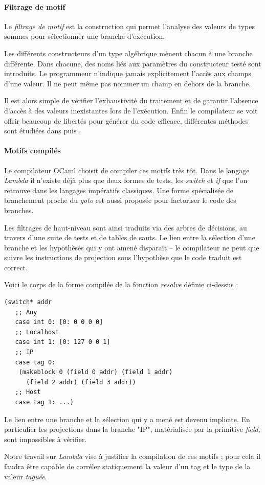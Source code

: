 \paragraph{Filtrage de motif} Le \emph{filtrage de motif} est la construction
qui permet l'analyse des valeurs de types sommes pour sélectionner une branche
d'exécution.

Les différents constructeurs d'un type algébrique mènent chacun à une branche
différente. Dans chacune, des noms liés aux paramètres du constructeur
testé sont introduits. Le programmeur n'indique jamais explicitement l'accès
aux champs d'une valeur. Il ne peut même pas nommer un champ en dehors de la
branche.

Il est alors simple de vérifier l'exhaustivité du traitement et de garantir
l'absence d'accès à des valeurs inexistantes lors de l'exécution. Enfin le
compilateur se voit offrir beaucoup de libertés pour générer du code efficace,
différentes méthodes sont étudiées dans \cite{LeFessant:2001:OPM:507669.507641}
puis \cite{Maranget:2008:CPM:1411304.1411311}.

\paragraph{Motifs compilés} Le compilateur OCaml choisit de compiler ces motifs
très tôt. Dans le langage \emph{Lambda} il n'existe déjà plus que deux formes
de tests, les \emph{switch} et \emph{if} que l'on retrouve dans les langages
impératifs classiques. Une forme spécialisée de branchement proche du
\emph{goto} est aussi proposée pour factoriser le code des branches.

Les filtrages de haut-niveau sont ainsi traduits via des arbres de décisions,
au travers d'une suite de tests et de tables de sauts.  Le lien entre la
sélection d'une branche et les hypothèses qui y ont amené disparaît -- le
compilateur ne peut que suivre les instructions de projection sous l'hypothèse
que le code traduit est correct.

Voici le corps de la forme compilée de la fonction \emph{resolve} définie
ci-dessus :

\lstset{language=Lisp}
\begin{lstlisting}
(switch* addr
   ;; Any
   case int 0: [0: 0 0 0 0]
   ;; Localhost
   case int 1: [0: 127 0 0 1]
   ;; IP
   case tag 0:
    (makeblock 0 (field 0 addr) (field 1 addr)
      (field 2 addr) (field 3 addr))
   ;; Host
   case tag 1: ...)
\end{lstlisting}
\lstset{language=Caml}

Le lien entre une branche et la sélection qui y a mené est devenu implicite.
En particulier les projections dans la branche "IP", matérialisée par la
primitive \emph{field}, sont impossibles à vérifier.

Notre travail sur \emph{Lambda} vise à justifier la compilation de ces motifs ;
pour cela il faudra être capable de corréler statiquement la valeur d'un tag et
le type de la valeur \emph{taguée}.
